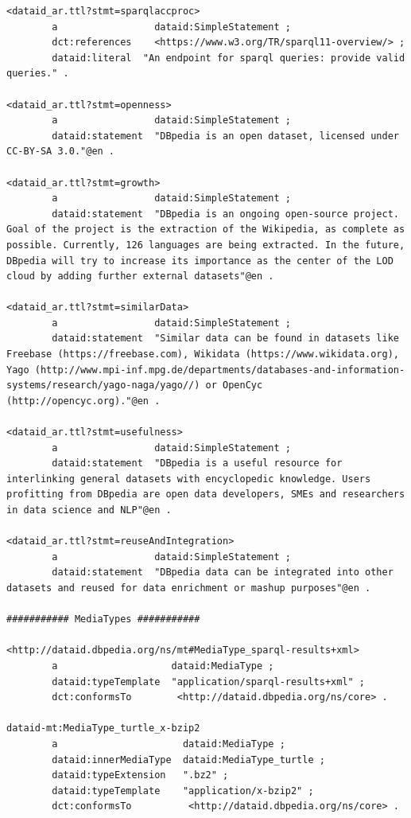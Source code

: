 \documentclass[a4paper,english,twoside,BCOR1.5cm,headsepline,DIV12,appendixprefix,final,12pt]{scrbook}
\begin{document}
\begin{lstlisting}[language=ttl, captionpos=b, label=lst:dcex,linewidth=\columnwidth,breaklines=true,basicstyle=\ttfamily\scriptsize]
<dataid_ar.ttl?stmt=sparqlaccproc>
        a                 dataid:SimpleStatement ;
        dct:references    <https://www.w3.org/TR/sparql11-overview/> ;  
        dataid:literal  "An endpoint for sparql queries: provide valid queries." .
        
<dataid_ar.ttl?stmt=openness>
        a                 dataid:SimpleStatement ;
        dataid:statement  "DBpedia is an open dataset, licensed under CC-BY-SA 3.0."@en .
        
<dataid_ar.ttl?stmt=growth>
        a                 dataid:SimpleStatement ;
        dataid:statement  "DBpedia is an ongoing open-source project. Goal of the project is the extraction of the Wikipedia, as complete as possible. Currently, 126 languages are being extracted. In the future, DBpedia will try to increase its importance as the center of the LOD cloud by adding further external datasets"@en .
        
<dataid_ar.ttl?stmt=similarData>
        a                 dataid:SimpleStatement ;
        dataid:statement  "Similar data can be found in datasets like Freebase (https://freebase.com), Wikidata (https://www.wikidata.org), Yago (http://www.mpi-inf.mpg.de/departments/databases-and-information-systems/research/yago-naga/yago//) or OpenCyc (http://opencyc.org)."@en .

<dataid_ar.ttl?stmt=usefulness>
        a                 dataid:SimpleStatement ;
        dataid:statement  "DBpedia is a useful resource for interlinking general datasets with encyclopedic knowledge. Users profitting from DBpedia are open data developers, SMEs and researchers in data science and NLP"@en .

<dataid_ar.ttl?stmt=reuseAndIntegration>
        a                 dataid:SimpleStatement ;
        dataid:statement  "DBpedia data can be integrated into other datasets and reused for data enrichment or mashup purposes"@en .

########### MediaTypes ###########

<http://dataid.dbpedia.org/ns/mt#MediaType_sparql-results+xml>
        a                    dataid:MediaType ;
        dataid:typeTemplate  "application/sparql-results+xml" ;
        dct:conformsTo        <http://dataid.dbpedia.org/ns/core> .

dataid-mt:MediaType_turtle_x-bzip2
        a                      dataid:MediaType ;
        dataid:innerMediaType  dataid:MediaType_turtle ;
        dataid:typeExtension   ".bz2" ;
        dataid:typeTemplate    "application/x-bzip2" ;
        dct:conformsTo          <http://dataid.dbpedia.org/ns/core> .


\end{lstlisting}
\end{document}
